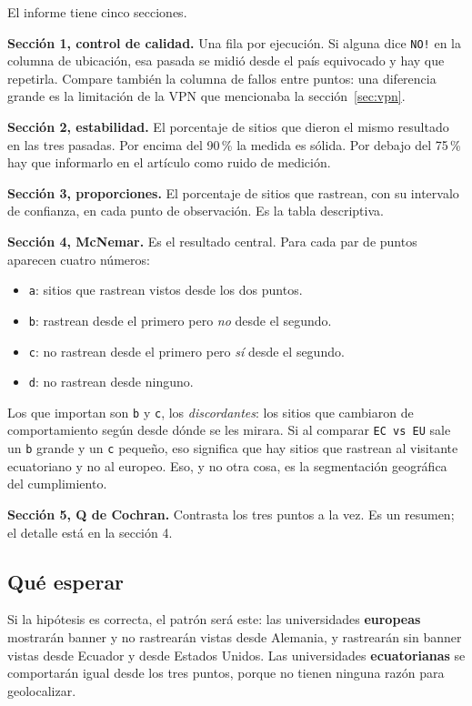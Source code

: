 \documentclass[11pt,a4paper]{article}
\begin{document}
El informe tiene cinco secciones.

\textbf{Sección 1, control de calidad.} Una fila por ejecución. Si alguna dice \texttt{NO!} en la columna de ubicación, esa pasada se midió desde el país equivocado y hay que repetirla. Compare también la columna de fallos entre puntos: una diferencia grande es la limitación de la VPN que mencionaba la sección~\ref{sec:vpn}.

\textbf{Sección 2, estabilidad.} El porcentaje de sitios que dieron el mismo resultado en las tres pasadas. Por encima del 90\,\% la medida es sólida. Por debajo del 75\,\% hay que informarlo en el artículo como ruido de medición.

\textbf{Sección 3, proporciones.} El porcentaje de sitios que rastrean, con su intervalo de confianza, en cada punto de observación. Es la tabla descriptiva.

\textbf{Sección 4, McNemar.} Es el resultado central. Para cada par de puntos aparecen cuatro números:

\begin{itemize}
	\item \texttt{a}: sitios que rastrean vistos desde los dos puntos.
	\item \texttt{b}: rastrean desde el primero pero \emph{no} desde el segundo.
	\item \texttt{c}: no rastrean desde el primero pero \emph{sí} desde el segundo.
	\item \texttt{d}: no rastrean desde ninguno.
\end{itemize}

Los que importan son \texttt{b} y \texttt{c}, los \emph{discordantes}: los sitios que cambiaron de comportamiento según desde dónde se les mirara. Si al comparar \texttt{EC vs EU} sale un \texttt{b} grande y un \texttt{c} pequeño, eso significa que hay sitios que rastrean al visitante ecuatoriano y no al europeo. Eso, y no otra cosa, es la segmentación geográfica del cumplimiento.

\textbf{Sección 5, Q de Cochran.} Contrasta los tres puntos a la vez. Es un resumen; el detalle está en la sección 4.

\subsection{Qué esperar}

Si la hipótesis es correcta, el patrón será este: las universidades \textbf{europeas} mostrarán banner y no rastrearán vistas desde Alemania, y rastrearán sin banner vistas desde Ecuador y desde Estados Unidos. Las universidades \textbf{ecuatorianas} se comportarán igual desde los tres puntos, porque no tienen ninguna razón para geolocalizar.
\end{document}

